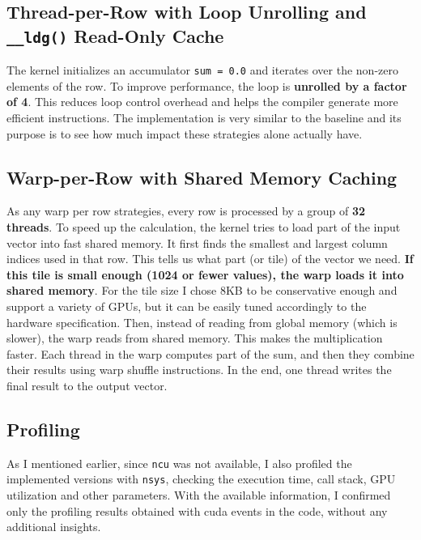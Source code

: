 \documentclass[conference]{IEEEtran}
\begin{document}
\subsection{Thread-per-Row with Loop Unrolling and \texttt{\_\_ldg()} Read-Only Cache}

The kernel initializes an accumulator \texttt{sum = 0.0} and iterates over the non-zero elements of the row. To improve performance, the loop is \textbf{unrolled by a factor of 4}. This reduces loop control overhead and helps the compiler generate more efficient instructions. The implementation is very similar to the baseline and its purpose is to see how much impact these strategies alone actually have.

\subsection{Warp-per-Row with Shared Memory Caching}

As any warp per row strategies, every row is processed by a group of \textbf{32 threads}. To speed up the calculation, the kernel tries to load part of the input vector into fast shared memory. It first finds the smallest and largest column indices used in that row. This tells us what part (or tile) of the vector we need. \textbf{If this tile is small enough (1024 or fewer values), the warp loads it into shared memory}. For the tile size I chose 8KB to be conservative enough and support a variety of GPUs, but it can be easily tuned accordingly to the hardware specification. Then, instead of reading from global memory (which is slower), the warp reads from shared memory. This makes the multiplication faster. Each thread in the warp computes part of the sum, and then they combine their results using warp shuffle instructions. In the end, one thread writes the final result to the output vector.

\subsection{Profiling}

As I mentioned earlier, since \texttt{ncu} was not available, I also profiled the implemented versions with \texttt{nsys}, checking the execution time, call stack, GPU utilization and other parameters. With the available information, I confirmed only the profiling results obtained with cuda events in the code, without any additional insights.
\end{document}
